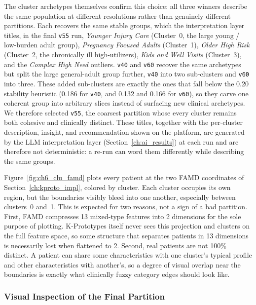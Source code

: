 The cluster archetypes themselves confirm this choice: all three winners describe the same population at different resolutions rather than genuinely different partitions. Each recovers the same stable groups, which the interpretation layer titles, in the final \texttt{v55} run, \emph{Younger Injury Care} (Cluster~0, the large young / low-burden adult group), \emph{Pregnancy Focused Adults} (Cluster~1), \emph{Older High Risk} (Cluster~2, the chronically ill high-utilizers), \emph{Kids and Well Visits} (Cluster~3), and the \emph{Complex High Need} outliers. \texttt{v40} and \texttt{v60} recover the same archetypes but split the large general-adult group further, \texttt{v40} into two sub-clusters and \texttt{v60} into three. These added sub-clusters are exactly the ones that fall below the 0.20 stability heuristic (0.186 for \texttt{v40}, and 0.132 and 0.166 for \texttt{v60}), so they carve one coherent group into arbitrary slices instead of surfacing new clinical archetypes. We therefore selected \texttt{v55}, the coarsest partition whose every cluster remains both cohesive and clinically distinct. These titles, together with the per-cluster description, insight, and recommendation shown on the platform, are generated by the LLM interpretation layer (Section~\ref{ch:ai_results}) at each run and are therefore not deterministic: a re-run can word them differently while describing the same groups.

Figure~\ref{fig:ch6_clu_famd} plots every patient at the two FAMD coordinates of Section~\ref{ch:kproto_impl}, colored by cluster. Each cluster occupies its own region, but the boundaries visibly bleed into one another, especially between clusters~0 and~1. This is expected for two reasons, not a sign of a bad partition. First, FAMD compresses 13 mixed-type features into 2 dimensions for the sole purpose of plotting. K-Prototypes itself never sees this projection and clusters on the full feature space, so some structure that separates patients in 13 dimensions is necessarily lost when flattened to 2. Second, real patients are not 100\% distinct. A patient can share some characteristics with one cluster's typical profile and other characteristics with another's, so a degree of visual overlap near the boundaries is exactly what clinically fuzzy category edges should look like.

\subsubsection*{Visual Inspection of the Final Partition}

